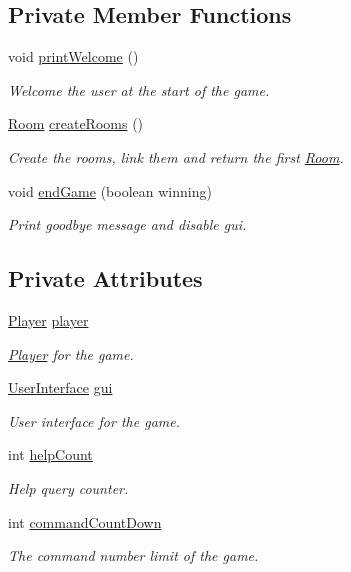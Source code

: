 \subsection*{Private Member Functions}
\begin{DoxyCompactItemize}
\item 
void \hyperlink{classGameEngine_a9a2f3cb921bb19399e357bf14d26425b}{print\-Welcome} ()
\begin{DoxyCompactList}\small\item\em Welcome the user at the start of the game. \end{DoxyCompactList}\item 
\hyperlink{classRoom}{Room} \hyperlink{classGameEngine_a9410d92f7d0e6820059b1d07da364b09}{create\-Rooms} ()
\begin{DoxyCompactList}\small\item\em Create the rooms, link them and return the first \hyperlink{classRoom}{Room}. \end{DoxyCompactList}\item 
void \hyperlink{classGameEngine_a1f5fa36c5dfc36c9a963fe439afc057b}{end\-Game} (boolean winning)
\begin{DoxyCompactList}\small\item\em Print goodbye message and disable gui. \end{DoxyCompactList}\end{DoxyCompactItemize}
\subsection*{Private Attributes}
\begin{DoxyCompactItemize}
\item 
\hyperlink{classPlayer}{Player} \hyperlink{classGameEngine_a4666c6719428cc43014b30b305eeef5d}{player}
\begin{DoxyCompactList}\small\item\em \hyperlink{classPlayer}{Player} for the game. \end{DoxyCompactList}\item 
\hyperlink{classUserInterface}{User\-Interface} \hyperlink{classGameEngine_a2a7d0bb6183b3f3ef3ee2008926374a0}{gui}
\begin{DoxyCompactList}\small\item\em User interface for the game. \end{DoxyCompactList}\item 
int \hyperlink{classGameEngine_a308a9926d553d53cb4c56c28588f6c62}{help\-Count}
\begin{DoxyCompactList}\small\item\em Help query counter. \end{DoxyCompactList}\item 
int \hyperlink{classGameEngine_ad4ff8d760eced9c7b76cdeb0dc989975}{command\-Count\-Down}
\begin{DoxyCompactList}\small\item\em The command number limit of the game. \end{DoxyCompactList}\end{DoxyCompactItemize}


